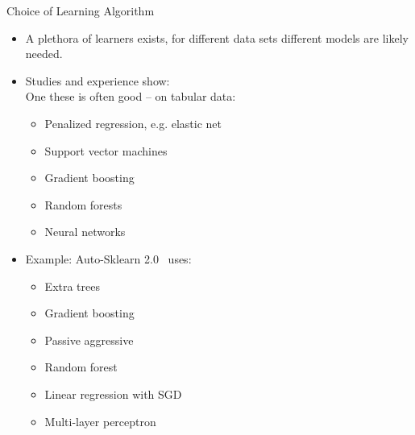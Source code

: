\begin{frame}{Choice of Learning Algorithm}
  \begin{itemize}
    \item A plethora of learners exists, for different data sets different models
        are likely needed.

        
    \item Studies and experience show:\\

        One these is often good -- on tabular data:
    \begin{itemize}
      \item Penalized regression, e.g. elastic net
      \item Support vector machines
      \item Gradient boosting
      \item Random forests
      \item Neural networks
  \end{itemize}

      \item Example: Auto-Sklearn 2.0~ uses: 

    \begin{itemize}
        \item Extra trees 
        \item Gradient boosting 
        \item Passive aggressive 
        \item Random forest 
        \item Linear regression with SGD
        \item Multi-layer perceptron
  \end{itemize}
    \end{itemize}
\end{frame}

